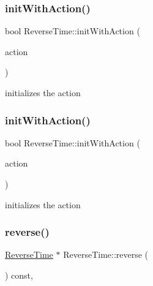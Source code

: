 \subsubsection{\texorpdfstring{init\+With\+Action()}{initWithAction()}\hspace{0.1cm}{\footnotesize\ttfamily [1/2]}}
{\footnotesize\ttfamily bool Reverse\+Time\+::init\+With\+Action (\begin{DoxyParamCaption}\item[{\hyperlink{classFiniteTimeAction}{Finite\+Time\+Action} $\ast$}]{action }\end{DoxyParamCaption})}

initializes the action \mbox{\label{classReverseTime_ae1bcb66b1fa2a6eee710e241ff8872b9}} 
\subsubsection{\texorpdfstring{init\+With\+Action()}{initWithAction()}\hspace{0.1cm}{\footnotesize\ttfamily [2/2]}}
{\footnotesize\ttfamily bool Reverse\+Time\+::init\+With\+Action (\begin{DoxyParamCaption}\item[{\hyperlink{classFiniteTimeAction}{Finite\+Time\+Action} $\ast$}]{action }\end{DoxyParamCaption})}

initializes the action \mbox{\label{classReverseTime_a191b205600fcebbc7b0a5101bcef9a7d}} 
\subsubsection{\texorpdfstring{reverse()}{reverse()}\hspace{0.1cm}{\footnotesize\ttfamily [1/2]}}
{\footnotesize\ttfamily \hyperlink{classReverseTime}{Reverse\+Time} $\ast$ Reverse\+Time\+::reverse (\begin{DoxyParamCaption}\item[{void}]{ }\end{DoxyParamCaption}) const\hspace{0.3cm}{\ttfamily [override]}, {\ttfamily [virtual]}}

